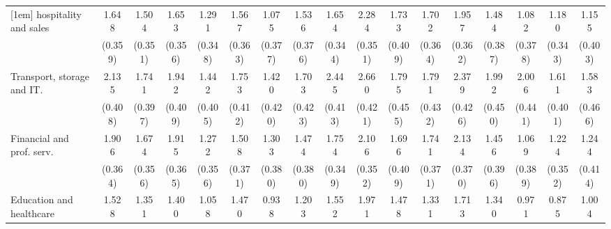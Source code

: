 {\begin{tabular}{l*{16}{c}}
[1em]
hospitality and sales&       1.648\sym{***}&       1.504\sym{***}&       1.653\sym{***}&       1.291\sym{***}&       1.567\sym{***}&       1.075\sym{**} &       1.536\sym{***}&       1.654\sym{***}&       2.284\sym{***}&       1.733\sym{***}&       1.702\sym{***}&       1.957\sym{***}&       1.484\sym{***}&       1.082\sym{**} &       1.180\sym{***}&       1.155\sym{**} \\
                    &     (0.359)         &     (0.351)         &     (0.356)         &     (0.348)         &     (0.363)         &     (0.377)         &     (0.376)         &     (0.344)         &     (0.351)         &     (0.409)         &     (0.364)         &     (0.362)         &     (0.387)         &     (0.378)         &     (0.343)         &     (0.403)         \\
[1em]
Transport, storage and IT.&       2.135\sym{***}&       1.741\sym{***}&       1.942\sym{***}&       1.442\sym{***}&       1.753\sym{***}&       1.420\sym{***}&       1.703\sym{***}&       2.445\sym{***}&       2.660\sym{***}&       1.795\sym{***}&       1.791\sym{***}&       2.379\sym{***}&       1.992\sym{***}&       2.006\sym{***}&       1.611\sym{***}&       1.583\sym{***}\\
                    &     (0.408)         &     (0.397)         &     (0.409)         &     (0.405)         &     (0.412)         &     (0.420)         &     (0.423)         &     (0.413)         &     (0.421)         &     (0.455)         &     (0.432)         &     (0.426)         &     (0.450)         &     (0.441)         &     (0.401)         &     (0.466)         \\
[1em]
Financial and prof. serv.&       1.906\sym{***}&       1.674\sym{***}&       1.915\sym{***}&       1.272\sym{***}&       1.508\sym{***}&       1.303\sym{***}&       1.474\sym{***}&       1.754\sym{***}&       2.106\sym{***}&       1.696\sym{***}&       1.741\sym{***}&       2.134\sym{***}&       1.456\sym{***}&       1.069\sym{**} &       1.224\sym{***}&       1.244\sym{**} \\
                    &     (0.364)         &     (0.356)         &     (0.365)         &     (0.356)         &     (0.371)         &     (0.380)         &     (0.380)         &     (0.349)         &     (0.352)         &     (0.409)         &     (0.371)         &     (0.370)         &     (0.396)         &     (0.389)         &     (0.352)         &     (0.414)         \\
[1em]
Education and healthcare&       1.528\sym{***}&       1.351\sym{***}&       1.400\sym{***}&       1.058\sym{**} &       1.470\sym{***}&       0.938\sym{*}  &       1.203\sym{**} &       1.552\sym{***}&       1.971\sym{***}&       1.478\sym{***}&       1.331\sym{***}&       1.713\sym{***}&       1.340\sym{***}&       0.971\sym{*}  &       0.875\sym{*}  &       1.004\sym{*}  \\

\end{tabular}}

